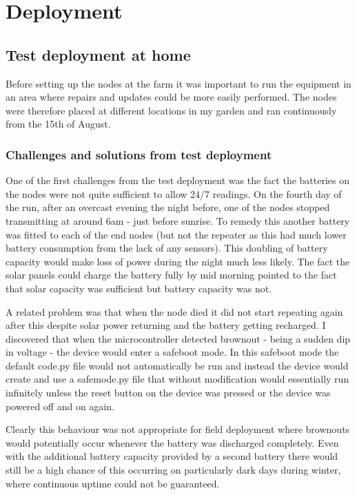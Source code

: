 \section{Deployment}

\subsection{Test deployment at home}

Before setting up the nodes at the farm it was important to run the equipment in
an area where repairs and updates could be more easily performed. The nodes were
therefore placed at different locations in my garden and ran continuously from
the 15th of August.

\subsubsection{Challenges and solutions from test deployment}

One of the first challenges from the test deployment was the fact the batteries
on the nodes were not quite sufficient to allow 24/7 readings. On the fourth day
of the run, after an overcast evening the night before, one of the nodes stopped
transmitting at around 6am - just before sunrise. To remedy this another battery
was fitted to each of the end nodes (but not the repeater as this had much lower
battery consumption from the lack of any sensors). This doubling of battery
capacity would make loss of power during the night much less likely. The fact
the solar panels could charge the battery fully by mid morning pointed to the
fact that solar capacity was sufficient but battery capacity was not.

A related problem was that when the node died it did not start repeating again
after this despite solar power returning and the battery getting recharged. I
discovered that when the microcontroller detected brownout - being a sudden dip
in voltage - the device would enter a safeboot mode. In this safeboot mode the
default code.py file would not automatically be run and instead the device would
create and use a safemode.py file that without modification would essentially
run infinitely unless the reset button on the device was pressed or the device
was powered off and on again.

Clearly this behaviour was not appropriate for field deployment where brownouts
would potentially occur whenever the battery was discharged completely. Even
with the additional battery capacity provided by a second battery there would
still be a high chance of this occurring on particularly dark days during
winter, where continuous uptime could not be guaranteed.

